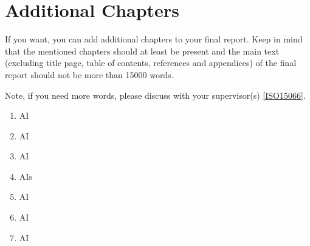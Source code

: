 \chapter{Additional Chapters}\label{chap:additional_chapters}

If you want, you can add additional chapters to your final report. Keep in mind that the mentioned chapters should at least be present and the main text (excluding title page, table of contents, references and appendices) of the final report should not be more than 15000 words.

Note, if you need more words, please discuss with your supervisor(s) \ref{ISO15066}.

\begin{enumerate}
    \item \gls{AI}
    \item \gls{AI}
    \item \Gls{AI}
    \item \glspl{AI}
    \item \acrshort{AI}
    \item \acrlong{AI}
    \item \acrfull{AI}
\end{enumerate}
